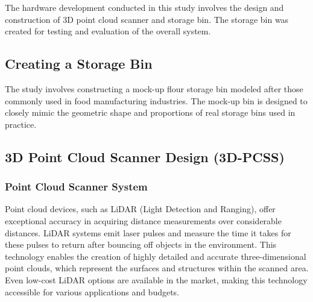 The hardware development conducted in this study involves the design and construction of 3D point cloud scanner and storage bin. The storage bin was created for testing and evaluation of the overall system.



\subsection{Creating a Storage Bin}
\label{ch4:subsec:Modeling of Flour Bin}
The study involves constructing a mock-up flour storage bin modeled after those commonly used in food manufacturing industries. The mock-up bin is designed to closely mimic the geometric shape and proportions of real storage bins used in practice.

\subsection{3D Point Cloud Scanner Design (3D-PCSS)}
\label{ch4:subsec:3d_point_cloud_scanner_design}

\subsubsection*{Point Cloud Scanner System}

Point cloud devices, such as LiDAR (Light Detection and Ranging), offer exceptional accuracy in acquiring distance measurements over considerable distances. LiDAR systems emit laser pulses and measure the time it takes for these pulses to return after bouncing off objects in the environment. This technology enables the creation of highly detailed and accurate three-dimensional point clouds, which represent the surfaces and structures within the scanned area. Even low-cost LiDAR options are available in the market, making this technology accessible for various applications and budgets.

